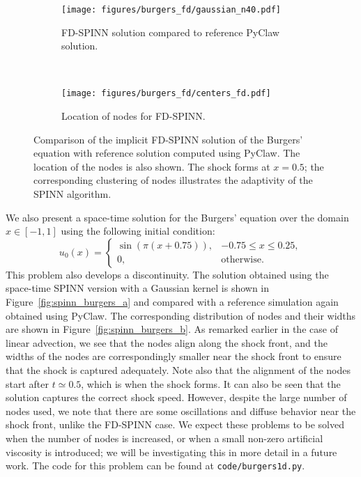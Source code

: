\documentclass[12pt]{article}
\begin{document}
\begin{figure}
\begin{subfigure}{0.5\textwidth}
\texttt{[image: figures/burgers\_fd/gaussian\_n40.pdf]}
\caption{FD-SPINN solution compared to reference PyClaw solution.}
\label{fig:burgers_comp}
\end{subfigure}
~
\begin{subfigure}{0.5\textwidth}
\texttt{[image: figures/burgers\_fd/centers\_fd.pdf]}
\caption{Location of nodes for FD-SPINN.}
\label{fig:burgers_nodes}
\end{subfigure}
\caption{Comparison of the implicit FD-SPINN solution of the Burgers' equation with reference solution computed using PyClaw. The location of the nodes is also shown. The shock forms at $x=0.5$; the corresponding clustering of nodes illustrates the adaptivity of the SPINN algorithm.}
\label{fig:inviscid_burgers}
\end{figure}

We also present a space-time solution for the Burgers' equation over the domain $x \in [-1, 1]$ using the following initial condition:
\begin{displaymath}
u_0(x) = \begin{cases}
\sin(\pi(x + 0.75)), & -0.75 \le x \le 0.25,\\
0, & \text{otherwise}.
\end{cases}
\end{displaymath}
This problem also develops a discontinuity. The solution obtained using the space-time SPINN version with a Gaussian kernel is shown in Figure~\ref{fig:spinn_burgers_a} and compared with a reference simulation again obtained using PyClaw. The corresponding distribution of nodes and their widths are shown in Figure~\ref{fig:spinn_burgers_b}. As remarked earlier in the case of linear advection, we see that the nodes align along the shock front, and the widths of the nodes are correspondingly smaller near the shock front to ensure that the shock is captured adequately. Note also that the alignment of the nodes start after $t \simeq 0.5$, which is when the shock forms. It can also be seen that the solution captures the correct shock speed. However, despite the large number of nodes used, we note that there are some oscillations and diffuse behavior near the shock front, unlike the FD-SPINN case. We expect these problems to be solved when the number of nodes is increased, or when a small non-zero artificial viscosity is introduced; we will be investigating this in more detail in a future work. The code for this problem can be found at \verb|code/burgers1d.py|.
\end{document}
